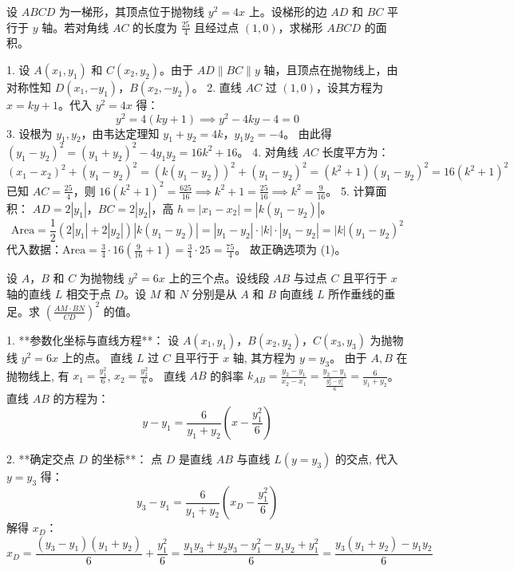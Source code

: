 \begin{questions}
\question
设 $ABCD$ 为一梯形，其顶点位于抛物线 $y^2 = 4x$ 上。设梯形的边 $AD$ 和 $BC$ 平行于 $y$ 轴。若对角线 $AC$ 的长度为 $\frac{25}{4}$ 且经过点 $(1, 0)$，求梯形 $ABCD$ 的面积。

\begin{solution}

1. 设 $A(x_1, y_1)$ 和 $C(x_2, y_2)$。由于 $AD \parallel BC \parallel y$ 轴，且顶点在抛物线上，由对称性知 $D(x_1, -y_1)$，$B(x_2, -y_2)$。
2. 直线 $AC$ 过 $(1, 0)$，设其方程为 $x = ky + 1$。代入 $y^2 = 4x$ 得：
\[ y^2 = 4(ky + 1) \implies y^2 - 4ky - 4 = 0 \]
3. 设根为 $y_1, y_2$，由韦达定理知 $y_1 + y_2 = 4k$，$y_1 y_2 = -4$。
由此得 $(y_1 - y_2)^2 = (y_1 + y_2)^2 - 4y_1 y_2 = 16k^2 + 16$。
4. 对角线 $AC$ 长度平方为：
\[ (x_1 - x_2)^2 + (y_1 - y_2)^2 = (k(y_1 - y_2))^2 + (y_1 - y_2)^2 = (k^2 + 1)(y_1 - y_2)^2 = 16(k^2 + 1)^2 \]
已知 $AC = \frac{25}{4}$，则 $16(k^2 + 1)^2 = \frac{625}{16} \implies k^2 + 1 = \frac{25}{16} \implies k^2 = \frac{9}{16}$。
5. 计算面积：
$AD = 2|y_1|$，$BC = 2|y_2|$，高 $h = |x_1 - x_2| = |k(y_1 - y_2)|$。
\[ \text{Area} = \frac{1}{2}(2|y_1| + 2|y_2|)|k(y_1 - y_2)| = |y_1 - y_2| \cdot |k| \cdot |y_1 - y_2| = |k|(y_1 - y_2)^2 \]
代入数据：$\text{Area} = \frac{3}{4} \cdot 16(\frac{9}{16} + 1) = \frac{3}{4} \cdot 25 = \frac{75}{4}$。
故正确选项为 (1)。
\end{solution}

\question
设 $A$，$B$ 和 $C$ 为抛物线 $y^2 = 6x$ 上的三个点。设线段 $AB$ 与过点 $C$ 且平行于 $x$ 轴的直线 $L$ 相交于点 $D$。设 $M$ 和 $N$ 分别是从 $A$ 和 $B$ 向直线 $L$ 所作垂线的垂足。求 $\left( \frac{AM \cdot BN}{CD} \right)^2$ 的值。

\begin{solution}
1. **参数化坐标与直线方程**：
设 $A(x_1, y_1)$，$B(x_2, y_2)$，$C(x_3, y_3)$ 为抛物线 $y^2 = 6x$ 上的点。
直线 $L$ 过 $C$ 且平行于 $x$ 轴, 其方程为 $y = y_3$。
由于 $A, B$ 在抛物线上, 有 $x_1 = \frac{y_1^2}{6}$, $x_2 = \frac{y_2^2}{6}$。
直线 $AB$ 的斜率 $k_{AB} = \frac{y_2 - y_1}{x_2 - x_1} = \frac{y_2 - y_1}{\frac{y_2^2 - y_1^2}{6}} = \frac{6}{y_1 + y_2}$。
直线 $AB$ 的方程为：
\[ y - y_1 = \frac{6}{y_1 + y_2} \left( x - \frac{y_1^2}{6} \right) \]

2. **确定交点 $D$ 的坐标**：
点 $D$ 是直线 $AB$ 与直线 $L (y = y_3)$ 的交点, 代入 $y = y_3$ 得：
\[ y_3 - y_1 = \frac{6}{y_1 + y_2} \left( x_D - \frac{y_1^2}{6} \right) \]
解得 $x_D$：
\[ x_D = \frac{(y_3 - y_1)(y_1 + y_2)}{6} + \frac{y_1^2}{6} = \frac{y_1 y_3 + y_2 y_3 - y_1^2 - y_1 y_2 + y_1^2}{6} = \frac{y_3(y_1 + y_2) - y_1 y_2}{6} \]


\end{solution}
\end{questions}
